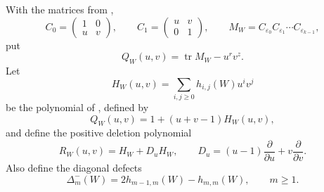 \documentclass[11pt]{article}
\begin{document}
With the matrices from \cite[Sections 2--3]{Proof},
\[
 C_0=\begin{pmatrix}1&0\\ u&v\end{pmatrix},\qquad
 C_1=\begin{pmatrix}u&v\\ 0&1\end{pmatrix},\qquad
 M_W=C_{\varepsilon_0}C_{\varepsilon_1}\cdots C_{\varepsilon_{k-1}},
\]
put
\[
 Q_W(u,v)=\operatorname{tr}M_W-u^rv^z.
\]
Let
\[
 H_W(u,v)=\sum_{i,j\geq0}h_{i,j}(W)u^iv^j
\]
be the polynomial of \cite[equation (10)]{Proof}, defined by
\[
 Q_W(u,v)=1+(u+v-1)H_W(u,v),                                \tag{3}
\]
and define the positive deletion polynomial
\[
 R_W(u,v)=H_W+D_uH_W,
 \qquad
 D_u=(u-1)\frac{\partial}{\partial u}
                  +v\frac{\partial}{\partial v}.            \tag{4}
\]
Also define the diagonal defects
\[
 \Delta_m^-(W)=2h_{m-1,m}(W)-h_{m,m}(W),
 \qquad m\geq1.                                             \tag{5}
\]
\end{document}

